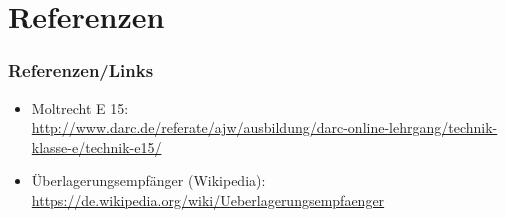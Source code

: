 \section*{Referenzen}

\begin{frame}
    \frametitle{Referenzen/Links}
    
    \footnotesize
    \begin{itemize}
        \item Moltrecht E 15: \\
              \url{http://www.darc.de/referate/ajw/ausbildung/darc-online-lehrgang/technik-klasse-e/technik-e15/}
        \item Überlagerungsempfänger (Wikipedia): \\
              \url{https://de.wikipedia.org/wiki/Ueberlagerungsempfaenger}
    \end{itemize}

\end{frame}


